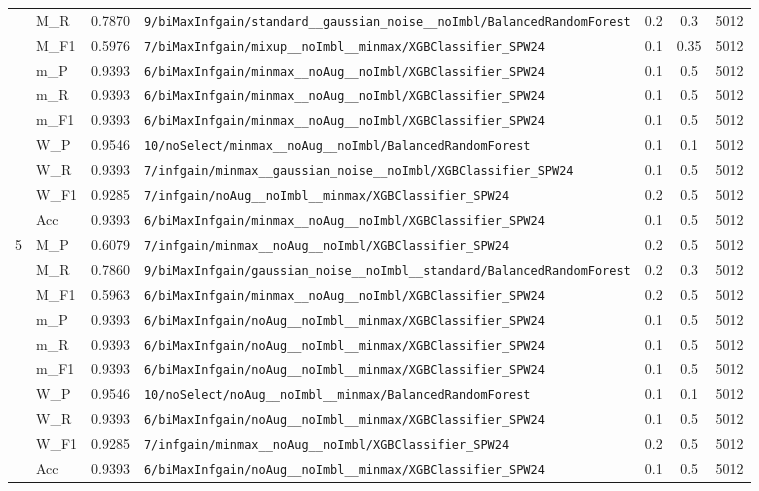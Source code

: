 \begin{table}[htbp]
\begin{tabular}{|c|l|c|>{\ttfamily\footnotesize}p{7.2cm}|c|c|c|}
 & M\_R & 0.7870 & \texttt{9/biMaxInfgain/standard\_\_gaussian\_noise\_\_noImbl/BalancedRandomForest} & 0.2 & 0.3  & 5012 \\ 
 & M\_F1 & 0.5976 & \texttt{7/biMaxInfgain/mixup\_\_noImbl\_\_minmax/XGBClassifier\_SPW24} & 0.1 & 0.35  & 5012 \\ 
 & m\_P & 0.9393 & \texttt{6/biMaxInfgain/minmax\_\_noAug\_\_noImbl/XGBClassifier\_SPW24} & 0.1 & 0.5  & 5012 \\ 
 & m\_R & 0.9393 & \texttt{6/biMaxInfgain/minmax\_\_noAug\_\_noImbl/XGBClassifier\_SPW24} & 0.1 & 0.5  & 5012 \\ 
 & m\_F1 & 0.9393 & \texttt{6/biMaxInfgain/minmax\_\_noAug\_\_noImbl/XGBClassifier\_SPW24} & 0.1 & 0.5  & 5012 \\ 
 & W\_P & 0.9546 & \texttt{10/noSelect/minmax\_\_noAug\_\_noImbl/BalancedRandomForest} & 0.1 & 0.1  & 5012 \\ 
 & W\_R & 0.9393 & \texttt{7/infgain/minmax\_\_gaussian\_noise\_\_noImbl/XGBClassifier\_SPW24} & 0.1 & 0.5  & 5012 \\ 
 & W\_F1 & 0.9285 & \texttt{7/infgain/noAug\_\_noImbl\_\_minmax/XGBClassifier\_SPW24} & 0.2 & 0.5  & 5012 \\ 
 & Acc & 0.9393 & \texttt{6/biMaxInfgain/minmax\_\_noAug\_\_noImbl/XGBClassifier\_SPW24} & 0.1 & 0.5  & 5012 \\ 
\hline
\multirow{10}{*}{5} & M\_P & 0.6079 & \texttt{7/infgain/minmax\_\_noAug\_\_noImbl/XGBClassifier\_SPW24} & 0.2 & 0.5  & 5012 \\ 
 & M\_R & 0.7860 & \texttt{9/biMaxInfgain/gaussian\_noise\_\_noImbl\_\_standard/BalancedRandomForest} & 0.2 & 0.3  & 5012 \\ 
 & M\_F1 & 0.5963 & \texttt{6/biMaxInfgain/minmax\_\_noAug\_\_noImbl/XGBClassifier\_SPW24} & 0.2 & 0.5  & 5012 \\ 
 & m\_P & 0.9393 & \texttt{6/biMaxInfgain/noAug\_\_noImbl\_\_minmax/XGBClassifier\_SPW24} & 0.1 & 0.5  & 5012 \\ 
 & m\_R & 0.9393 & \texttt{6/biMaxInfgain/noAug\_\_noImbl\_\_minmax/XGBClassifier\_SPW24} & 0.1 & 0.5  & 5012 \\ 
 & m\_F1 & 0.9393 & \texttt{6/biMaxInfgain/noAug\_\_noImbl\_\_minmax/XGBClassifier\_SPW24} & 0.1 & 0.5  & 5012 \\ 
 & W\_P & 0.9546 & \texttt{10/noSelect/noAug\_\_noImbl\_\_minmax/BalancedRandomForest} & 0.1 & 0.1  & 5012 \\ 
 & W\_R & 0.9393 & \texttt{6/biMaxInfgain/noAug\_\_noImbl\_\_minmax/XGBClassifier\_SPW24} & 0.1 & 0.5  & 5012 \\ 
 & W\_F1 & 0.9285 & \texttt{7/infgain/minmax\_\_noAug\_\_noImbl/XGBClassifier\_SPW24} & 0.2 & 0.5  & 5012 \\ 
 & Acc & 0.9393 & \texttt{6/biMaxInfgain/noAug\_\_noImbl\_\_minmax/XGBClassifier\_SPW24} & 0.1 & 0.5  & 5012 \\ 
\hline
\end{tabular}
\end{table}